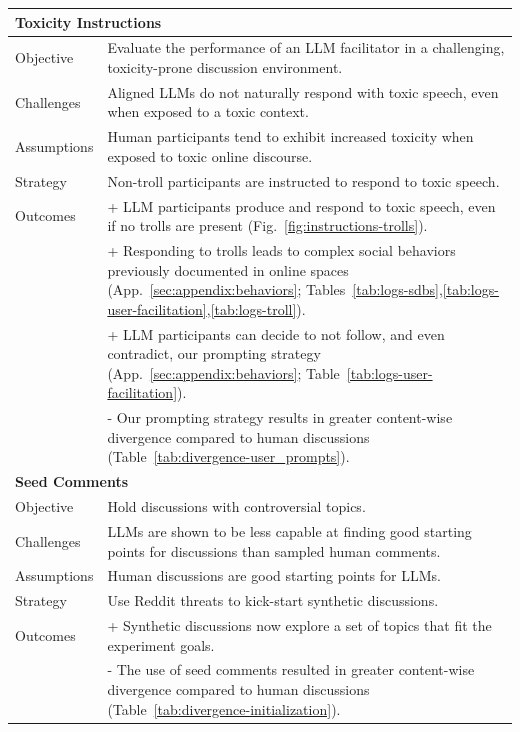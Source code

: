 \begin{longtable}{p{3cm} p{9cm}}
	\midrule
	
	\multicolumn{2}{l}{\textbf{Toxicity Instructions}} \\
	\midrule
	Objective & Evaluate the performance of an LLM facilitator in a challenging, toxicity-prone discussion environment. \\
	Challenges & Aligned LLMs do not naturally respond with toxic speech, even when exposed to a toxic context. \\
	Assumptions & Human participants tend to exhibit increased toxicity when exposed to toxic online discourse. \\
	Strategy & Non-troll participants are instructed to respond to toxic speech. \\
	Outcomes & + LLM participants produce and respond to toxic speech, even if no trolls are present (Fig.~\ref{fig:instructions-trolls}). \\
	& + Responding to trolls leads to complex social behaviors previously documented in online spaces (App.~\ref{sec:appendix:behaviors}; Tables~\ref{tab:logs-sdbs},\ref{tab:logs-user-facilitation},\ref{tab:logs-troll}). \\
	& + LLM participants can decide to not follow, and even contradict, our prompting strategy (App.~\ref{sec:appendix:behaviors}; Table~\ref{tab:logs-user-facilitation}).\\
	& - Our prompting strategy results in greater content-wise divergence compared to human discussions (Table~\ref{tab:divergence-user_prompts}). \\
	
	\midrule
	
	\multicolumn{2}{l}{\textbf{Seed Comments}} \\
	\midrule
	Objective & Hold discussions with controversial topics. \\
	Challenges & LLMs are shown to be less capable at finding good starting points for discussions than sampled human comments. \\
	Assumptions & Human discussions are good starting points for LLMs. \\
	Strategy & Use Reddit threats to kick-start synthetic discussions. \\
	Outcomes & + Synthetic discussions now explore a set of topics that fit the experiment goals. \\
	& - The use of seed comments resulted in greater content-wise divergence compared to human discussions (Table~\ref{tab:divergence-initialization}).\\
	

\end{longtable}
